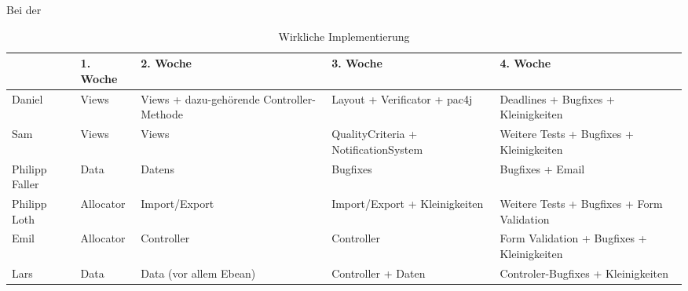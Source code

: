 \documentclass[parskip=full]{scrartcl}
\begin{document}
Bei der 



\begin{table}[H]
\begin{tabularx}{\textwidth}{|l|l|X|X|X|}
\hline
 	& 1. Woche			& 2. Woche		& 3. Woche & 4. Woche\\
\hline 
Daniel	& Views			& Views + dazu-gehörende Controller-Methode & Layout + Verificator
+ pac4j&Deadlines + Bugfixes +
Kleinigkeiten \\
\hline
Sam & Views&Views& QualityCriteria +
NotificationSystem & Weitere Tests +
Bugfixes +
Kleinigkeiten\\
\hline
Philipp Faller&Data&Datens&Bugfixes&Bugfixes +  Email\\
\hline
Philipp Loth&Allocator&Import/Export
&Import/Export + Kleinigkeiten &Weitere Tests +
Bugfixes +
Form Validation\\
\hline
Emil&Allocator&Controller&Controller&Form Validation +
Bugfixes +
Kleinigkeiten\\
\hline
Lars&Data&Data (vor allem
Ebean)&Controller + Daten &
Controler-Bugfixes +
Kleinigkeiten\\
\hline
\end{tabularx}
\caption{Wirkliche Implementierung}
\end{table}
\end{document}
